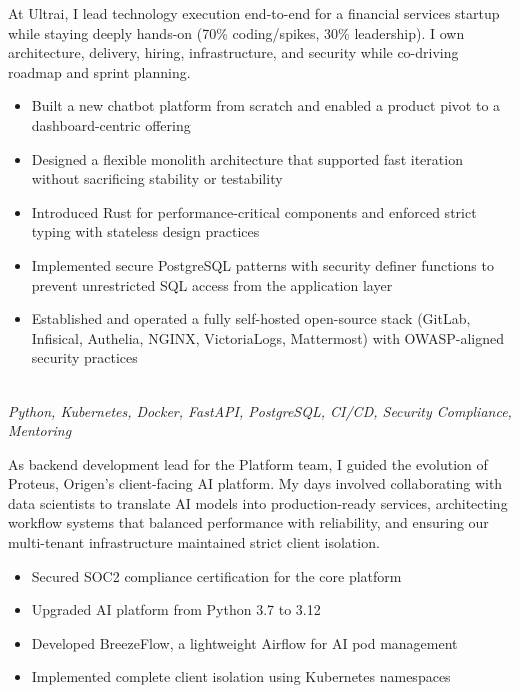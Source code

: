\documentclass[a4paper,10pt]{article}
\newcommand{\experiencebreak}{\needspace{18\baselineskip}}
\begin{document}
At Ultrai, I lead technology execution end-to-end for a financial services startup while staying deeply hands-on (70\% coding/spikes, 30\% leadership). I own architecture, delivery, hiring, infrastructure, and security while co-driving roadmap and sprint planning.

\vspace{0.2cm}
\begin{itemize}[label=\textcolor{darkblue}{\textbullet}, leftmargin=*, nosep]
	\item Built a new chatbot platform from scratch and enabled a product pivot to a dashboard-centric offering
	\item Designed a flexible monolith architecture that supported fast iteration without sacrificing stability or testability
	\item Introduced Rust for performance-critical components and enforced strict typing with stateless design practices
	\item Implemented secure PostgreSQL patterns with security definer functions to prevent unrestricted SQL access from the application layer
	\item Established and operated a fully self-hosted open-source stack (GitLab, Infisical, Authelia, NGINX, VictoriaLogs, Mattermost) with OWASP-aligned security practices
\end{itemize}

\vspace{0.4cm}

\experiencebreak
\noindent\uline{} \\
\vspace{0.1cm} \hspace{0.2cm}
{\small\textit{Python, Kubernetes, Docker, FastAPI, PostgreSQL, CI/CD, Security Compliance, Mentoring}}

As backend development lead for the Platform team, I guided the evolution of Proteus, Origen's client-facing AI platform. My days involved collaborating with data scientists to translate AI models into production-ready services, architecting workflow systems that balanced performance with reliability, and ensuring our multi-tenant infrastructure maintained strict client isolation.

\vspace{0.2cm}
\begin{itemize}[label=\textcolor{darkblue}{\textbullet}, leftmargin=*, nosep]
	\item Secured SOC2 compliance certification for the core platform
	\item Upgraded AI platform from Python 3.7 to 3.12
	\item Developed BreezeFlow, a lightweight Airflow for AI pod management
	\item Implemented complete client isolation using Kubernetes namespaces
\end{itemize}
\end{document}
